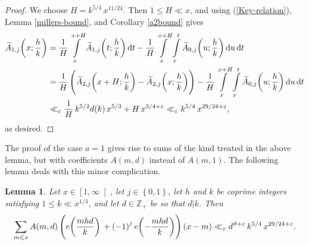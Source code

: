 \documentclass[a4paper,10pt,twoside]{amsart}
\newtheorem{lemma}[theorem]{Lemma}
\theoremstyle{definition}
\numberwithin{equation}{section}
\newcommand\eps{\varepsilon}
\renewcommand\:{\colon}
\begin{document}
\begin{proof}
We choose $H=k^{5/4}\,x^{11/24}$. Then $1\leqslant H\ll x$, and using (\ref{Key-relation}), Lemma \ref{millers-bound}, and Corollary \ref{a2bound} gives
\begin{align*}
\widetilde A_{1,j}\!\left(x;\frac hk\right)
&=\frac1H\int\limits_x^{x+H}\widetilde A_{1,j}\!\left(t;\frac hk\right)\mathrm dt
-\frac1H\int\limits_x^{x+H}\int\limits_x^t\widetilde A_{0,j}\!\left(u;\frac hk\right)\mathrm du\,\mathrm dt\\
&=\frac1H\left(\widetilde A_{2,j}\!\left(x+H;\frac hk\right)-\vphantom{\Bigg|}\widetilde A_{2,j}\!\left(x;\frac hk\right)\right)-\frac1H\int\limits_x^{x+H}\int\limits_x^t\widetilde A_{0,j}\!\left(u;\frac hk\right)\mathrm du\,\mathrm dt\\
&\ll_\eps\frac1H\,k^{5/2}d(k)\,x^{5/3}+H\,x^{3/4+\varepsilon}\ll_\eps k^{5/4}\,x^{29/24+\varepsilon},
\end{align*}
as desired. 
\end{proof}

\noindent The proof of the case $a=1$ gives rise to sums of the kind treated in the above lemma, but with coefficients $A(m,d)$ instead of $A(m,1)$. The following lemma deals with this minor complication.

\begin{lemma}\label{simple-a1bound2}
Let $x\in\left[1,\infty\right[$, let $j\in\left\{0,1\right\}$, let $h$ and $k$ be coprime integers satisfying $1\leqslant k\ll x^{1/3}$, and let $d\in\mathbb Z_+$ be so that $d|k$. Then
\[\sum_{m\leqslant x}A(m,d)\left(e\!\left(\frac{mhd}k\right)\vphantom{\Bigg|}+\left(-1\right)^je\!\left(-\frac{mhd}k\right)\right)\left(x-m\right)\ll_\varepsilon d^{\vartheta+\varepsilon}\,k^{5/4}\,x^{29/24+\varepsilon}.\]
\end{lemma}
\end{document}
